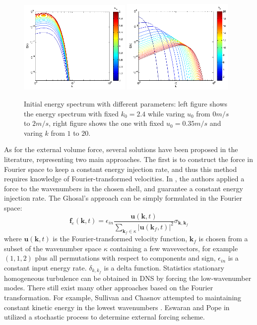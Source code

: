 \begin{figure}[!htbp]\centering
\includegraphics[width=0.48\textwidth]{Figures/eng_spr_u}
\includegraphics[width=0.48\textwidth]{Figures/eng_spr_k}
\caption{Initial energy spectrum with different parameters: left figure shows the energy spectrum with fixed $k_0 = 2.4$ while varing $u_0$ from $0m/s$ to $2m/s$, right figure shows the one with fixed $u_0 = 0.35m/s$ and varing $k$ from $1$ to $20$.\label{fig:eng_spr}}
\end{figure}

As for the external volume force, several solutions have been proposed in the literature, representing two main approaches. The first is to construct the force in Fourier space to keep a constant energy injection rate, and thus this method requires knowledge of Fourier-transformed velocities. In \cite{ghosal1995dynamic, Carati1995Representation}, the authors applied a force to the wavenumbers in the chosen shell, and guarantee a constant energy injection rate. The Ghosal's approach \cite{ghosal1995dynamic} can be simply formulated in the Fourier space: 
\begin{equation}
\mathbf{f}_e(\mathbf{k},t) = \epsilon_{in}\frac{\mathbf{u}(\mathbf{k},t)}
{\sum_{\mathbf{k}_f\in \kappa}|\mathbf{u}(\mathbf{k}_f,t)|^2}
\sigma_{\mathbf{k},\mathbf{k}_f}
\end{equation}
where $\mathbf{u}(\mathbf{k},t)$ is the Fourier-transformed velocity function, $\mathbf{k}_f$ is chosen from a subset of the wavenumber space $\kappa$ containing a few wavevectors, for example $(1,1,2)$ plus all permutations with respect to components and sign, $\epsilon_{in}$ is a constant input energy rate. $\delta_{k,k_f}$ is a delta function. Statistics stationary homogeneous turbulence can be obtained in DNS by forcing the low-wavenumber modes. There still exist many other approaches based on the Fourier transformation. For example, Sullivan and Chasnov attempted to maintaining constant kinetic energy in the lowest wavenumbers \cite{Sullivan1994Deterministic, Chasnov1991Simulation}. Eswaran and Pope in \cite{Eswaran1988} utilized a stochastic process to determine external forcing scheme. 

